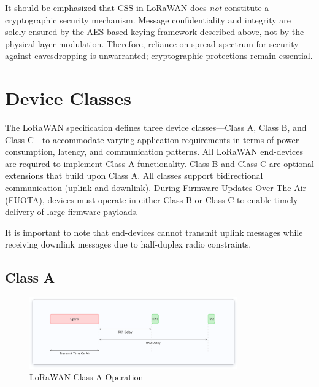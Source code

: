 It should be emphasized that CSS in LoRaWAN does \emph{not} constitute a cryptographic security mechanism. Message confidentiality and integrity are solely ensured by the AES-based keying framework described above, not by the physical layer modulation. Therefore, reliance on spread spectrum for security against eavesdropping is unwarranted; cryptographic protections remain essential.


\section{Device Classes}

The LoRaWAN specification defines three device classes—Class A, Class B, and Class C—to accommodate varying application requirements in terms of power consumption, latency, and communication patterns. All LoRaWAN end-devices are required to implement Class A functionality. Class B and Class C are optional extensions that build upon Class A. All classes support bidirectional communication (uplink and downlink). During Firmware Updates Over-The-Air (FUOTA), devices must operate in either Class B or Class C to enable timely delivery of large firmware payloads.

It is important to note that end-devices cannot transmit uplink messages while receiving downlink messages due to half-duplex radio constraints.

\subsection{Class A}
\begin{figure}[htbp]
    \centering
    \includegraphics[width=0.8\textwidth]{figures/class-a.png}
    \caption{LoRaWAN Class A Operation}
    \label{fig:lora_class_a}
\end{figure}

